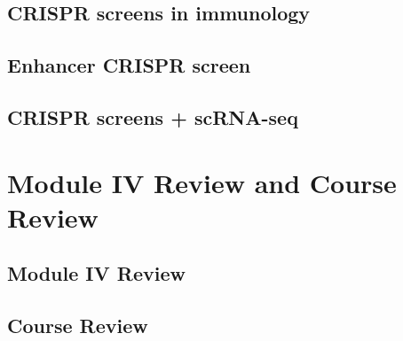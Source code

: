 \documentclass[
]{book}
\begin{document}
\hypertarget{crispr-screens-in-immunology}{%
\section{CRISPR screens in immunology}\label{crispr-screens-in-immunology}}

\hypertarget{enhancer-crispr-screen}{%
\section{Enhancer CRISPR screen}\label{enhancer-crispr-screen}}

\hypertarget{crispr-screens-scrna-seq}{%
\section{CRISPR screens + scRNA-seq}\label{crispr-screens-scrna-seq}}

\hypertarget{m4re}{%
\chapter{Module IV Review and Course Review}\label{m4re}}

\hypertarget{module-iv-review}{%
\section{Module IV Review}\label{module-iv-review}}

\hypertarget{course-review}{%
\section{Course Review}\label{course-review}}
\end{document}
